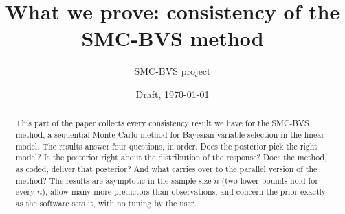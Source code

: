 \documentclass[11pt]{article}
\title{What we prove: consistency of the SMC-BVS method}
\author{SMC-BVS project}
\date{Draft, \today}
\begin{document}
\maketitle

\begin{abstract}
\noindent
This part of the paper collects every consistency result we have for the SMC-BVS method, a sequential Monte Carlo method for
Bayesian variable selection in the linear model. The results answer four questions, in order. Does the posterior pick
the right model? Is the posterior right about the distribution of the response? Does the method, as coded, deliver that
posterior? And what carries over to the parallel version of the method? The results are asymptotic in the sample size
$n$ (two lower bounds hold for every $n$), allow many more predictors than observations, and concern the prior exactly
as the software sets it, with no tuning by the user.
\end{abstract}










\appendix

\end{document}
